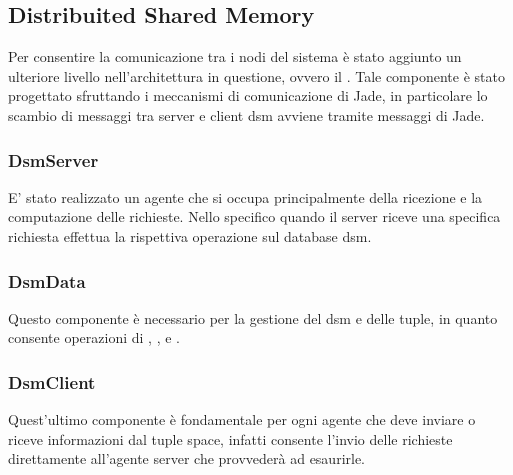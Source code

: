 \subsection{Distribuited Shared Memory}
Per consentire la comunicazione tra i nodi del sistema è stato aggiunto un ulteriore livello nell'architettura in questione, ovvero il . Tale componente è stato progettato sfruttando i meccanismi di comunicazione di Jade, in particolare lo scambio di messaggi tra server e client dsm avviene tramite messaggi di Jade.
\subsubsection{DsmServer}
E' stato realizzato un agente che si occupa principalmente della ricezione e la computazione delle richieste. Nello specifico quando il server riceve una specifica richiesta effettua la rispettiva operazione sul database dsm.
\subsubsection{DsmData}
Questo componente è necessario per la gestione del dsm e delle tuple, in quanto consente operazioni di , ,  e .
\subsubsection{DsmClient}
Quest'ultimo componente è fondamentale per ogni agente che deve inviare o riceve informazioni dal tuple space, infatti consente l'invio delle richieste direttamente all'agente server che provvederà ad esaurirle.
